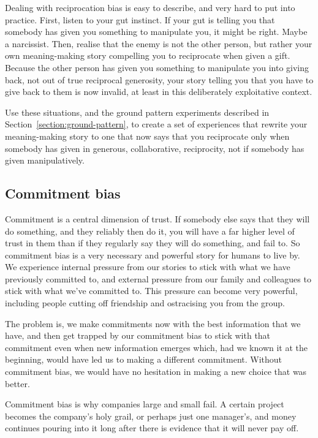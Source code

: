 Dealing with reciprocation bias is easy to describe, and very hard to put into practice. First, listen to your gut instinct. If your gut is telling you that somebody has given you something to manipulate you, it might be right. Maybe a narcissist. Then, realise that the enemy is not the other person, but rather your own meaning\hyp{}making story compelling you to reciprocate when given a gift. Because the other person has given you something to manipulate you into giving back, not out of true reciprocal generosity, your story telling you that you have to give back to them is now invalid, at least in this deliberately exploitative context.


Use these situations, and the ground pattern experiments described in Section~\ref{section:ground-pattern}, to create a set of experiences that rewrite your meaning\hyp{}making story to one that now says that you reciprocate only when somebody has given in generous, collaborative, reciprocity, not if somebody has given manipulatively.


\subsection{Commitment bias}
Commitment is a central dimension of trust.  If somebody else says that they will do something, and they reliably then do it, you will have a far higher level of trust in them than if they regularly say they will do something, and fail to. So commitment bias is a very necessary and powerful story for humans to live by. We experience internal pressure from our stories to stick with what we have previously committed to, and external pressure from our family and colleagues to stick with what we've committed to. This pressure can become very powerful, including people cutting off friendship and ostracising you from the group.


The problem is, we make commitments now with the best information that we have, and then get trapped by our commitment bias to stick with that commitment even when new information emerges which, had we known it at the beginning, would have led us to making a different commitment. Without commitment bias, we would have no hesitation in making a new choice that was better.


Commitment bias is why companies large and small fail. A certain project becomes the company’s holy grail, or perhaps just one manager’s, and money continues  pouring into it long after there is evidence that it will never pay off.



